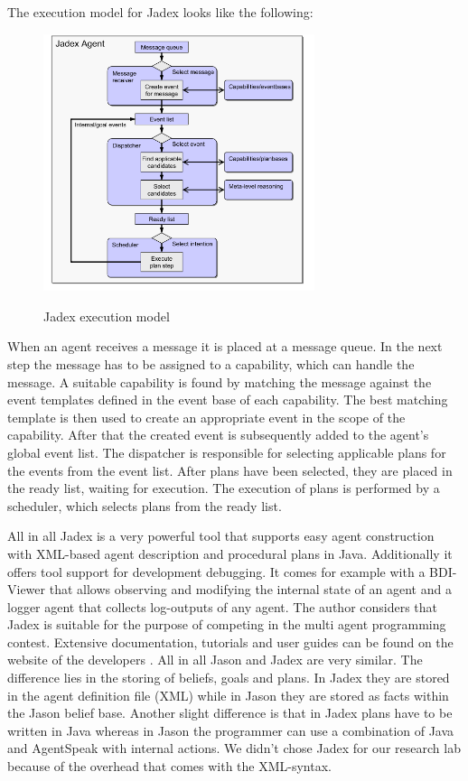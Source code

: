 The execution model for Jadex looks like the following:
\begin{figure}
	\centering
	\includegraphics[width=300px]{images/Jadex_execution_model.png}
	\label{fig4}
	\caption{Jadex execution model \cite{Pokahr}}
\end{figure}
\newline
When an agent receives a message it is placed at a message queue. In the next step the message has to be assigned to a capability, which can handle the message. A suitable capability is found by matching the message against the event templates defined in the event base of each capability. The best matching template is then used to create an appropriate event in the scope of the capability. After that the created event is subsequently added to the agent's global event list. The dispatcher is responsible for selecting applicable plans for the events from the event list. After plans have been selected, they are placed in the ready list, waiting for execution. The execution of plans is performed by a scheduler, which selects plans from the ready list.

All in all Jadex is a very powerful tool that supports easy agent construction with XML-based agent description and procedural plans in Java. Additionally it offers tool support for development debugging. It comes for example with a BDI-Viewer that allows observing and modifying the internal state of an agent and a logger agent that collects log-outputs of any agent. The author considers that Jadex is suitable for the purpose of competing in the multi agent programming contest. Extensive documentation, tutorials and user guides can be found on the website of the developers \cite{Jadex}.
All in all Jason and Jadex are very similar. The difference lies in the storing of beliefs, goals and plans. In Jadex they are stored in the agent definition file (XML) while in Jason they are stored as facts within the Jason belief base. Another slight difference is that in Jadex plans have to be written in Java whereas in Jason the programmer can use a combination of Java and AgentSpeak with internal actions. We didn't chose Jadex for our research lab because of the overhead that comes with the XML-syntax.
